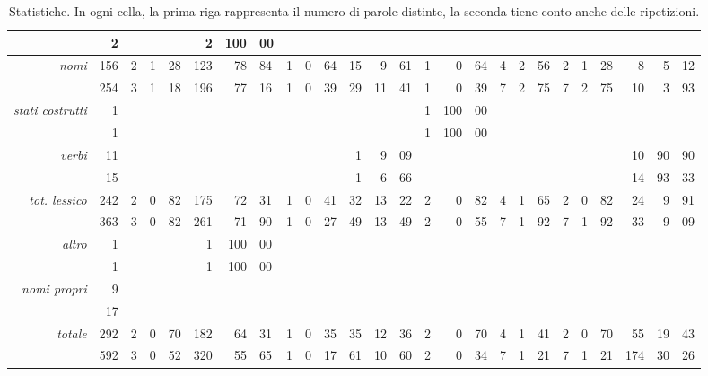 \begin{table}
{{\begin{tabular}{|>{\it}r|r|*{8}{rr@{.}l@{\% }|}}
 & 2 & \multicolumn{3}{c|}{} & 2&100&00 & \multicolumn{3}{c|}{} & \multicolumn{3}{c|}{} & \multicolumn{3}{c|}{} & \multicolumn{3}{c|}{} & \multicolumn{3}{c|}{} & \multicolumn{3}{c|}{}\\
\hline
nomi & 156 & 2&1&28 & 123&78&84 & 1&0&64 & 15&9&61 & 1&0&64 & 4&2&56 & 2&1&28 & 8&5&12\\
 & 254 & 3&1&18 & 196&77&16 & 1&0&39 & 29&11&41 & 1&0&39 & 7&2&75 & 7&2&75 & 10&3&93\\
\hline
stati costrutti & 1 & \multicolumn{3}{c|}{} & \multicolumn{3}{c|}{} & \multicolumn{3}{c|}{} & \multicolumn{3}{c|}{} & 1&100&00 & \multicolumn{3}{c|}{} & \multicolumn{3}{c|}{} & \multicolumn{3}{c|}{}\\
 & 1 & \multicolumn{3}{c|}{} & \multicolumn{3}{c|}{} & \multicolumn{3}{c|}{} & \multicolumn{3}{c|}{} & 1&100&00 & \multicolumn{3}{c|}{} & \multicolumn{3}{c|}{} & \multicolumn{3}{c|}{}\\
\hline
verbi & 11 & \multicolumn{3}{c|}{} & \multicolumn{3}{c|}{} & \multicolumn{3}{c|}{} & 1&9&09 & \multicolumn{3}{c|}{} & \multicolumn{3}{c|}{} & \multicolumn{3}{c|}{} & 10&90&90\\
 & 15 & \multicolumn{3}{c|}{} & \multicolumn{3}{c|}{} & \multicolumn{3}{c|}{} & 1&6&66 & \multicolumn{3}{c|}{} & \multicolumn{3}{c|}{} & \multicolumn{3}{c|}{} & 14&93&33\\
\hline
\hline
tot. lessico & 242 & 2&0&82 & 175&72&31 & 1&0&41 & 32&13&22 & 2&0&82 & 4&1&65 & 2&0&82 & 24&9&91\\
 & 363 & 3&0&82 & 261&71&90 & 1&0&27 & 49&13&49 & 2&0&55 & 7&1&92 & 7&1&92 & 33&9&09\\
\hline
\hline
altro & 1 & \multicolumn{3}{c|}{} & 1&100&00 & \multicolumn{3}{c|}{} & \multicolumn{3}{c|}{} & \multicolumn{3}{c|}{} & \multicolumn{3}{c|}{} & \multicolumn{3}{c|}{} & \multicolumn{3}{c|}{}\\
 & 1 & \multicolumn{3}{c|}{} & 1&100&00 & \multicolumn{3}{c|}{} & \multicolumn{3}{c|}{} & \multicolumn{3}{c|}{} & \multicolumn{3}{c|}{} & \multicolumn{3}{c|}{} & \multicolumn{3}{c|}{}\\
\hline
nomi propri & 9 & \multicolumn{3}{c|}{} & \multicolumn{3}{c|}{} & \multicolumn{3}{c|}{} & \multicolumn{3}{c|}{} & \multicolumn{3}{c|}{} & \multicolumn{3}{c|}{} & \multicolumn{3}{c|}{} & \multicolumn{3}{c|}{}\\
 & 17 & \multicolumn{3}{c|}{} & \multicolumn{3}{c|}{} & \multicolumn{3}{c|}{} & \multicolumn{3}{c|}{} & \multicolumn{3}{c|}{} & \multicolumn{3}{c|}{} & \multicolumn{3}{c|}{} & \multicolumn{3}{c|}{}\\
\hline
\hline
totale & 292 & 2&0&70 & 182&64&31 & 1&0&35 & 35&12&36 & 2&0&70 & 4&1&41 & 2&0&70 & 55&19&43\\
 & 592 & 3&0&52 & 320&55&65 & 1&0&17 & 61&10&60 & 2&0&34 & 7&1&21 & 7&1&21 & 174&30&26\\
\hline
\end{tabular}}}
\caption{Statistiche. In ogni cella, la prima riga rappresenta il numero di parole distinte, la seconda tiene conto anche delle ripetizioni.
        }
\label{tab:statistiche}
\end{table}
